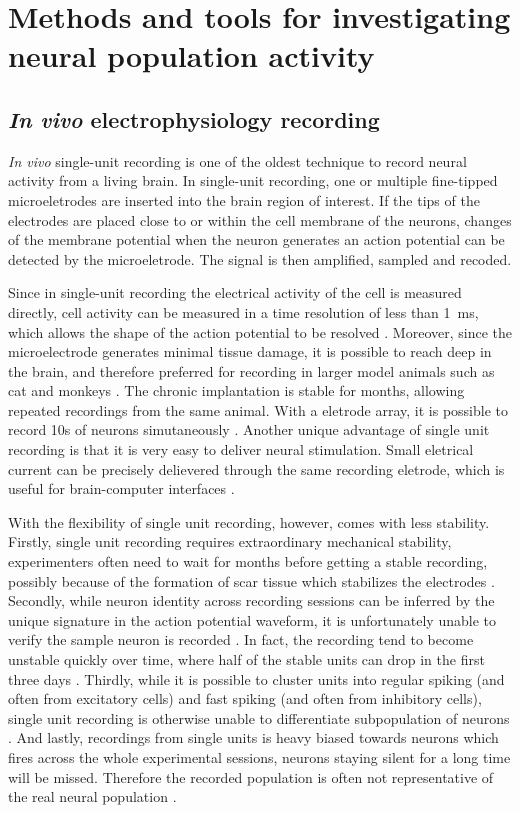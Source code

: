 \section{Methods and tools for investigating neural population activity \label{tech}}
\subsection{\textit{In vivo} electrophysiology recording}
\textit{In vivo} single-unit recording is one of the oldest technique to record neural activity from a living brain. In single-unit recording, one or multiple fine-tipped microeletrodes are inserted into the brain region of interest. If the tips of the electrodes are placed close to or within the cell membrane of the neurons, changes of the membrane potential when the neuron generates an action potential can be detected by the microeletrode. The signal is then amplified, sampled and recoded. 

Since in single-unit recording the electrical activity of the cell is measured directly, cell activity can be measured in a time resolution of less than \SI{1}{\ms}, which allows the shape of the action potential to be resolved \citep{lutcke13}. Moreover, since the microelectrode generates minimal tissue damage, it is possible to reach deep in the brain, and therefore preferred for recording in larger model animals such as cat and monkeys \citep{lutcke13}. The chronic implantation is stable for months, allowing repeated recordings from the same animal. With a eletrode array, it is possible to record 10s of neurons simutaneously \citep{lutcke13}. Another unique advantage of single unit recording is that it is very easy to deliver neural stimulation. Small eletrical current can be precisely delievered through the same recording eletrode, which is useful for brain-computer interfaces \citep{hatsopoulos09}. 

With the flexibility of single unit recording, however, comes with less stability. Firstly, single unit recording requires extraordinary mechanical stability, experimenters often need to wait for months before getting a stable recording, possibly because of the formation of scar tissue which stabilizes the electrodes \citep{jackson07}. Secondly, while neuron identity across recording sessions can be inferred by the unique signature in the action potential waveform, it is unfortunately unable to verify the sample neuron is recorded \citep{rousche98, schmitzer-torbert04, tolias07}. In fact, the recording tend to become unstable quickly over time, where half of the stable units can drop in the first three days \citep{fraser12}. Thirdly, while it is possible to cluster units into regular spiking (and often from excitatory cells) and fast spiking (and often from inhibitory cells), single unit recording is otherwise unable to differentiate subpopulation of neurons \citep{connors90}. And lastly, recordings from single units is heavy biased towards neurons which fires across the whole experimental sessions, neurons staying silent for a long time will be missed. Therefore the recorded population is often not representative of the real neural population \citep{lutcke13}. 

